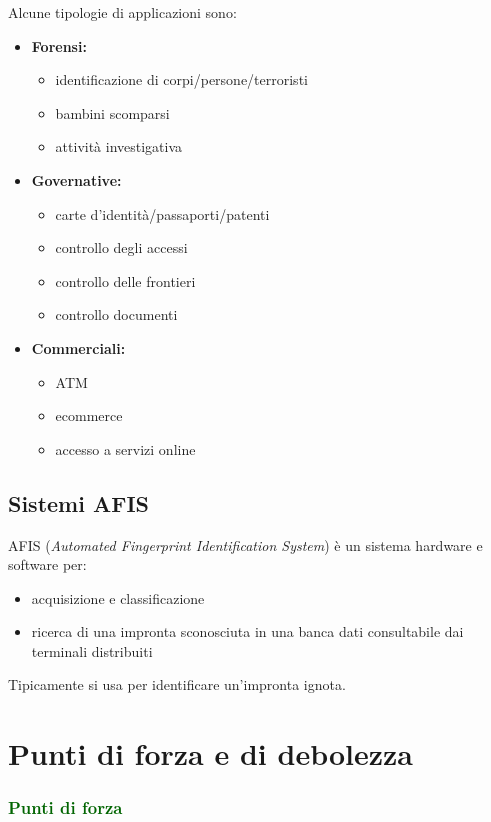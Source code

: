 \documentclass{report}
\begin{document}
\noindent Alcune tipologie di applicazioni sono:
\begin{itemize}
    \item \textbf{Forensi:}
    \begin{itemize}
        \item identificazione di corpi/persone/terroristi
        \item bambini scomparsi
        \item attività investigativa
    \end{itemize}
    \item  \textbf{Governative:}
    \begin{itemize}
        \item carte d'identità/passaporti/patenti
        \item controllo degli accessi
        \item controllo delle frontieri
        \item controllo documenti
    \end{itemize}
    \item \textbf{Commerciali:}
    \begin{itemize}
        \item ATM
        \item ecommerce
        \item accesso a servizi online
    \end{itemize}
\end{itemize}

\subsection{Sistemi AFIS}

AFIS (\textit{Automated Fingerprint Identification System}) è un sistema hardware e software
per:
\begin{itemize}
    \item acquisizione e classificazione
    \item ricerca di una impronta sconosciuta in una banca dati consultabile 
    dai terminali distribuiti
\end{itemize}
Tipicamente si usa per identificare un'impronta ignota.


\section{Punti di forza e di debolezza}
\subsubsection{\textcolor{darkgreen}{Punti di forza}}
\end{document}
